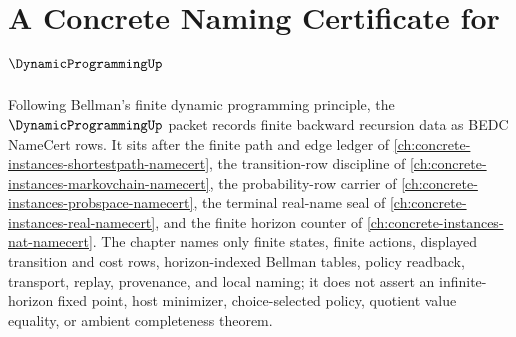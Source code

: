 \chapter{A Concrete Naming Certificate for $\DynamicProgrammingUp$}
\label{ch:concrete-instances-dynamic-programming-namecert}

Following Bellman's finite dynamic programming principle, the $\DynamicProgrammingUp$ packet records finite backward recursion data as BEDC NameCert rows. It sits after the finite path and edge ledger of \autoref{ch:concrete-instances-shortestpath-namecert}, the transition-row discipline of \autoref{ch:concrete-instances-markovchain-namecert}, the probability-row carrier of \autoref{ch:concrete-instances-probspace-namecert}, the terminal real-name seal of \autoref{ch:concrete-instances-real-namecert}, and the finite horizon counter of \autoref{ch:concrete-instances-nat-namecert}. The chapter names only finite states, finite actions, displayed transition and cost rows, horizon-indexed Bellman tables, policy readback, transport, replay, provenance, and local naming; it does not assert an infinite-horizon fixed point, host minimizer, choice-selected policy, quotient value equality, or ambient completeness theorem.

